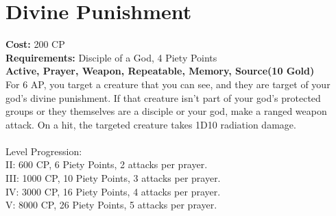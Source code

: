 \section{Divine Punishment}
\textbf{Cost:} 200 CP\\
\textbf{Requirements:} Disciple of a God, 4 Piety Points \\
\textbf{Active, Prayer, Weapon, Repeatable, Memory, Source(10 Gold)}\\
For 6 AP, you target a creature that you can see, and they are target of your god's divine punishment. If that creature isn't part of your god's protected groups or they themselves are a disciple or your god, make a ranged weapon attack. On a hit, the targeted creature takes 1D10 radiation damage.\\
\\
Level Progression:\\
II: 600 CP, 6 Piety Points, 2 attacks per prayer.\\
III: 1000 CP, 10 Piety Points, 3 attacks per prayer.\\
IV: 3000 CP, 16 Piety Points, 4 attacks per prayer.\\
V: 8000 CP, 26 Piety Points, 5 attacks per prayer.\\